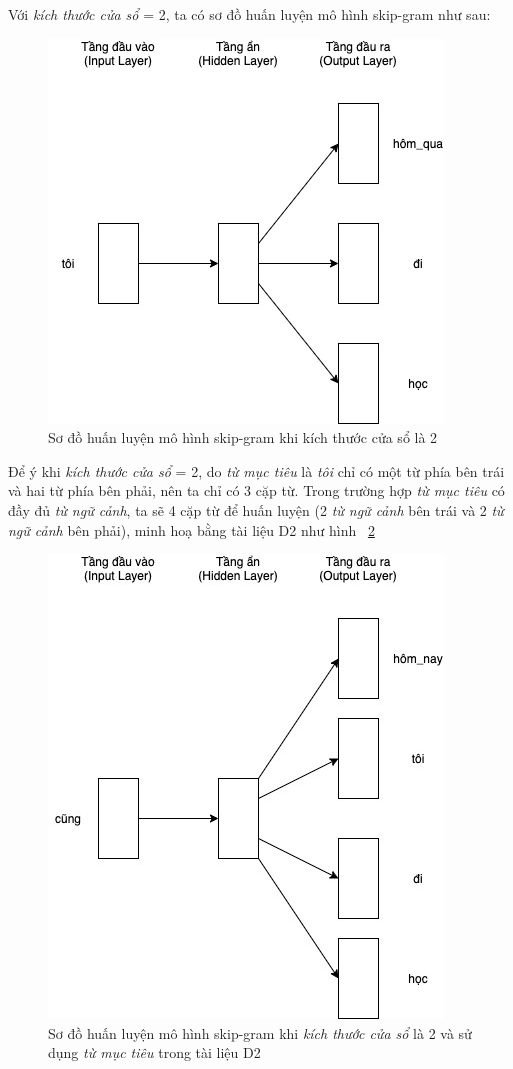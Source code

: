 Với \textit{kích thước cửa sổ} = 2, ta có sơ đồ huấn luyện mô hình skip-gram như sau:
\clearpage
\begin{figure}[!h]
	\centering
		\includegraphics[width=0.5\columnwidth]{chapter04/figure/skip-gram-window-size-2.jpg}
        \caption{Sơ đồ huấn luyện mô hình skip-gram khi kích thước cửa sổ là 2}
        \label{fig:skip_gram_window_size_2}
\end{figure}

Để ý khi \textit{kích thước cửa sổ} = 2, do \textit{từ mục tiêu} là \textit{tôi} chỉ có một từ phía bên trái và hai từ phía bên phải, nên ta chỉ có 3 cặp từ. Trong trường hợp \textit{từ mục tiêu} có đầy đủ \textit{từ ngữ cảnh}, ta sẽ 4 cặp từ để huấn luyện (2 \textit{từ ngữ cảnh} bên trái và 2 \textit{từ ngữ cảnh} bên phải), minh hoạ bằng tài liệu D2 như hình ~\ref{fig:skip_gram_window_size_2_full}

\begin{figure}[!h]
	\centering
		\includegraphics[width=0.5\columnwidth]{chapter04/figure/skip-gram-window-size-2-full.jpg}
        \caption{Sơ đồ huấn luyện mô hình skip-gram khi \textit{kích thước cửa sổ} là 2 và sử dụng \textit{từ mục tiêu} trong tài liệu D2}
        \label{fig:skip_gram_window_size_2_full}
\end{figure}

